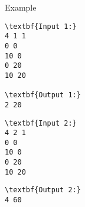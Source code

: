 Example
\begin{verbatim}
\textbf{Input 1:}
4 1 1
0 0
10 0
0 20
10 20

\textbf{Output 1:}
2 20\end{verbatim}
\begin{verbatim}
\textbf{Input 2:}
4 2 1
0 0
10 0
0 20
10 20\end{verbatim}
\begin{verbatim}
\textbf{Output 2:}
4 60\end{verbatim}